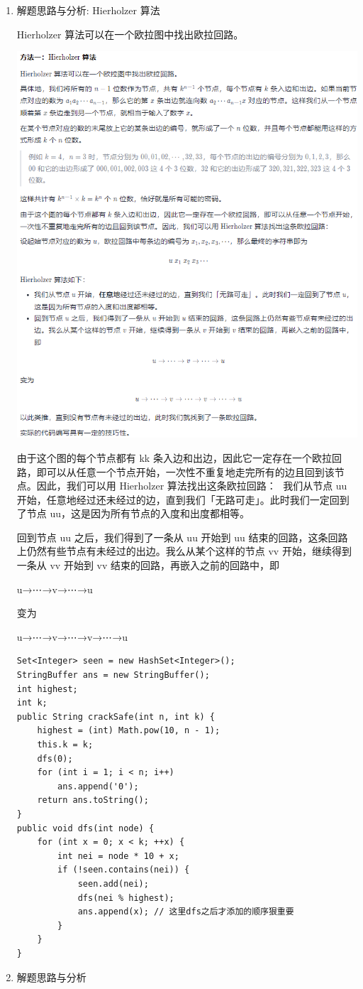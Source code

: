 \documentclass[9pt, b5paaper]{book}
\begin{document}
\begin{enumerate}
\item 解题思路与分析: Hierholzer 算法
\label{sec-1-5-1-1}

Hierholzer 算法可以在一个欧拉图中找出欧拉回路。

\includegraphics[width=.9\linewidth]{./pic/crackingSafe.png}

由于这个图的每个节点都有 kk 条入边和出边，因此它一定存在一个欧拉回路，即可以从任意一个节点开始，一次性不重复地走完所有的边且回到该节点。因此，我们可以用 Hierholzer 算法找出这条欧拉回路：
​
我们从节点 uu 开始，任意地经过还未经过的边，直到我们「无路可走」。此时我们一定回到了节点 uu，这是因为所有节点的入度和出度都相等。

回到节点 uu 之后，我们得到了一条从 uu 开始到 uu 结束的回路，这条回路上仍然有些节点有未经过的出边。我么从某个这样的节点 vv 开始，继续得到一条从 vv 开始到 vv 结束的回路，再嵌入之前的回路中，即

u→⋯→v→⋯→u

变为

u→⋯→v→⋯→v→⋯→u

\begin{verbatim}
Set<Integer> seen = new HashSet<Integer>();
StringBuffer ans = new StringBuffer();
int highest;
int k;
public String crackSafe(int n, int k) {
    highest = (int) Math.pow(10, n - 1);
    this.k = k;
    dfs(0);
    for (int i = 1; i < n; i++) 
        ans.append('0');
    return ans.toString();
}
public void dfs(int node) {
    for (int x = 0; x < k; ++x) {
        int nei = node * 10 + x;
        if (!seen.contains(nei)) {
            seen.add(nei);
            dfs(nei % highest);
            ans.append(x); // 这里dfs之后才添加的顺序狠重要
        }
    }
}
\end{verbatim}
\item 解题思路与分析
\label{sec-1-5-1-2}


\end{enumerate}
\end{document}
